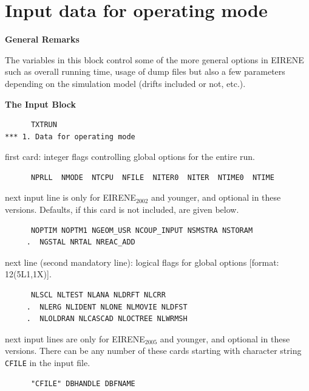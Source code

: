 \section{Input data for operating mode} \label{sec2.1}

\textbf{General Remarks} 

\medskip 

The variables in this block control some of the more general options in EIRENE
such as overall running time, usage of dump files but also a few parameters
depending on the simulation model (drifts included or not, etc.).

\medskip

\textbf{The Input Block} 

\begin{lstlisting}
      TXTRUN
*** 1. Data for operating mode
\end{lstlisting} 

first card:  integer flags controlling global options for the entire run.

\begin{lstlisting}
      NPRLL  NMODE  NTCPU  NFILE  NITER0  NITER  NTIME0  NTIME
\end{lstlisting}

next input line is only for EIRENE$_{2002}
$ and younger, and optional in these versions.
Defaults, if this card is not included, are given below.

\begin{lstlisting}
      NOPTIM NOPTM1 NGEOM_USR NCOUP_INPUT NSMSTRA NSTORAM
     .  NGSTAL NRTAL NREAC_ADD
\end{lstlisting}

next line (second mandatory line): logical flags for global options [format:
    12(5L1,1X)].

\begin{lstlisting}
      NLSCL NLTEST NLANA NLDRFT NLCRR
     .  NLERG NLIDENT NLONE NLMOVIE NLDFST
     .  NLOLDRAN NLCASCAD NLOCTREE NLWRMSH
\end{lstlisting}

next input lines are only for EIRENE$_{2005}
$ and younger, and optional in these versions.
There can be any number of these cards starting with character string
\lstinline|CFILE|	  in the input file.

\begin{lstlisting}
      "CFILE" DBHANDLE DBFNAME
\end{lstlisting}

\medskip

